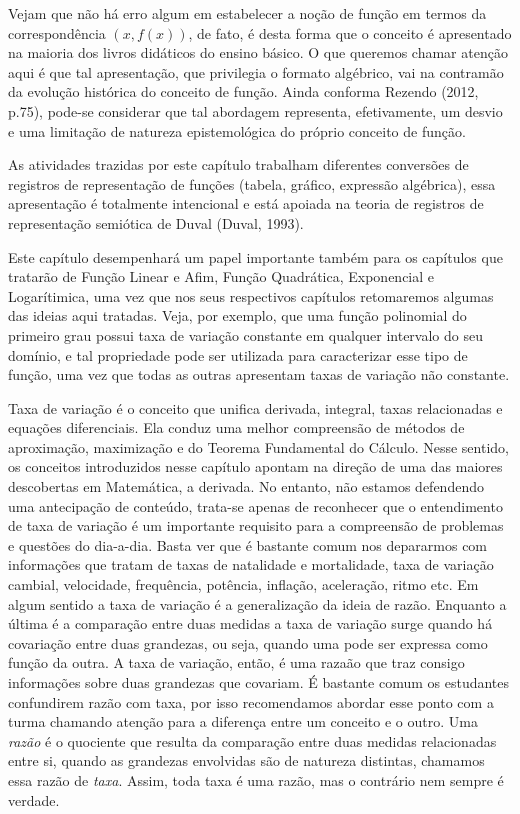 \begin{apresentacao}
Vejam que não há erro algum em estabelecer a noção de função em termos da correspondência $(x,f(x))$, de fato, é desta forma que o conceito é apresentado na maioria dos livros didáticos do ensino básico. O que queremos chamar atenção aqui é que tal apresentação, que privilegia o formato algébrico, vai na contramão da evolução histórica do conceito de função. Ainda conforma Rezendo (2012, p.75), pode-se considerar que tal abordagem representa, efetivamente, um desvio e uma limitação de natureza epistemológica do próprio conceito de função.

As atividades trazidas por este capítulo trabalham diferentes conversões de registros de representação de funções (tabela, gráfico, expressão algébrica), essa apresentação é totalmente intencional e está apoiada na teoria de registros de representação semiótica de Duval (Duval, 1993).

Este capítulo desempenhará um papel importante também para os capítulos que tratarão de Função Linear e Afim, Função Quadrática, Exponencial e Logarítimica, uma vez que nos seus respectivos capítulos retomaremos algumas das ideias aqui tratadas. Veja, por exemplo, que uma função polinomial do primeiro grau possui taxa de variação constante em qualquer intervalo do seu domínio, e tal propriedade pode ser utilizada para caracterizar esse tipo de função, uma vez que todas as outras apresentam taxas de variação não constante.

Taxa de variação é o conceito que unifica derivada, integral, taxas relacionadas e equações diferenciais. Ela conduz uma melhor compreensão de métodos de aproximação, maximização e do Teorema Fundamental do Cálculo. Nesse sentido, os conceitos introduzidos nesse capítulo apontam na direção de uma das maiores descobertas em Matemática, a derivada. No entanto, não estamos defendendo uma antecipação de conteúdo, trata-se apenas de reconhecer que o entendimento de taxa de variação é um importante requisito para a compreensão de problemas e questões do dia-a-dia. Basta ver que é bastante comum nos depararmos com informações que tratam de taxas de natalidade e mortalidade, taxa de variação cambial, velocidade, frequência, potência, inflação, aceleração, ritmo etc. Em algum sentido a taxa de variação é a generalização da ideia de razão. Enquanto a última é a comparação entre duas medidas a taxa de variação surge quando há covariação entre duas grandezas, ou seja, quando uma pode ser expressa como função da outra. A taxa de variação, então, é uma razaão que traz consigo informações sobre duas grandezas que covariam. É bastante comum os estudantes confundirem razão com taxa, por isso recomendamos abordar esse ponto com a turma chamando atenção para a diferença entre um conceito e o outro. Uma \textit{razão} é o quociente que resulta da comparação entre duas medidas relacionadas entre si, quando as grandezas envolvidas são de natureza distintas, chamamos essa razão de \textit{taxa}. Assim, toda taxa é uma razão, mas o contrário nem sempre é verdade.


\end{apresentacao}
